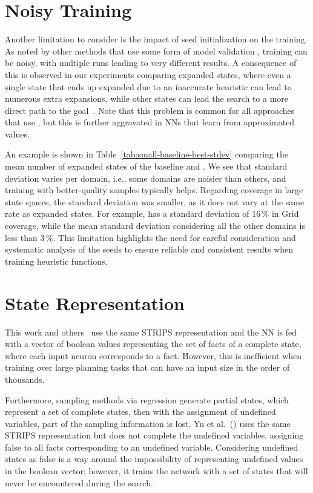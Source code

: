 \section{Noisy Training}

Another limitation to consider is the impact of seed initialization on the training. As noted by other methods that use some form of model validation \cite{Ferber.etal/2020a, Shen.etal/2020, Ferber.etal/2022, OToole/2022}, training can be noisy, with multiple runs leading to very different results. A consequence of this is observed in our experiments comparing expanded states, where even a single state that ends up expanded due to an inaccurate heuristic can lead to numerous extra expansions, while other states can lead the search to a more direct path to the goal~\cite{Heusner.etal/2017}. Note that this problem is common for all approaches that use \gbfs, but this is further aggravated in NNs that learn from approximated values.



An example is shown in Table~\ref{tab:small-baseline-best-stdev} comparing the mean number of expanded states of the baseline and \hnnrs. We see that standard deviation varies per domain, i.e., some domains are noisier than others, and training with better-quality samples typically helps. Regarding coverage in large state spaces, the standard deviation was smaller, as it does not vary at the same rate as expanded states. For example, \hnnrs has a standard deviation of $16\,\%$ in Grid coverage, while the mean standard deviation considering all the other domains is less than $3\,\%$. This limitation highlights the need for careful consideration and systematic analysis of the seeds to ensure reliable and consistent results when training heuristic functions.

\section{State Representation}

This work and others~\cite{Ferber.etal/2020a, Ferber.etal/2022, OToole/2022} use the same STRIPS representation and the NN is fed with a vector of boolean values representing the set of facts of a complete state, where each input neuron corresponds to a fact. However, this is inefficient when training over large planning tasks that can have an input size in the order of thousands.

Furthermore, sampling methods via regression generate partial states, which represent a set of complete states, then with the assignment of undefined variables, part of the sampling information is lost. Yu et al.~(\citeyear{Yu.etal/2020}) uses the same STRIPS representation but does not complete the undefined variables, assigning false to all facts corresponding to an undefined variable. Considering undefined states as false is a way around the impossibility of representing undefined values in the boolean vector; however, it trains the network with a set of states that will never be encountered during the search.

